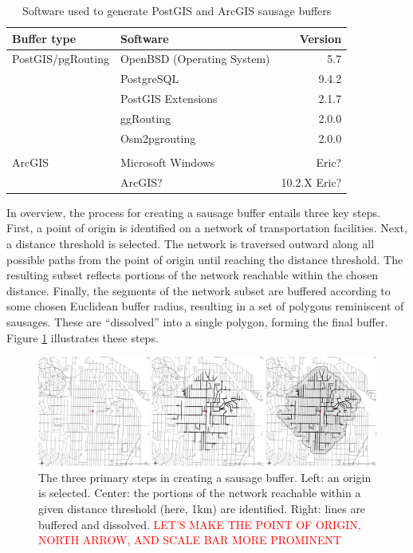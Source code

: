 \documentclass[11pt,letterpaper]{article} %
\begin{document}
\begin{table}[h!]
  \centering
  \caption{Software used to generate PostGIS and ArcGIS sausage buffers}
  \begin{tabular}{llr}
  \toprule
  Buffer type & Software & Version \\
  \midrule
PostGIS/pgRouting & OpenBSD (Operating System) & 5.7 \\
              & PostgreSQL & 9.4.2 \\
              & PostGIS Extensions & 2.1.7 \\
              & ggRouting & 2.0.0 \\
              & Osm2pgrouting & 2.0.0 \\
              &  &  \\
  ArcGIS & Microsoft Windows & Eric? \\
              & ArcGIS? & 10.2.X Eric? \\
  \bottomrule
\end{tabular}
\label{tab:software}
\end{table}

In overview, the process for creating a sausage buffer entails three
key steps. First, a point of origin is identified on a network of
transportation facilities. Next, a distance threshold is selected. The
network is traversed outward along all possible paths from the point
of origin until reaching the distance threshold. The resulting subset
reflects portions of the network reachable within the chosen
distance. Finally, the segments of the network subset are buffered
according to some chosen Euclidean buffer radius, resulting in a set of polygons
reminiscent of sausages. These are ``dissolved'' into a single polygon,
forming the final buffer. Figure \ref{fig:sausage-steps} illustrates
these steps.

\begin{figure}[h!]
  \centering
  \includegraphics[width=\textwidth]{./figs/sausage-steps}
  \caption{The three primary steps in creating a
    sausage buffer. Left: an origin is selected. Center: the portions
    of the network reachable within a given distance threshold (here,
    1km) are identified. Right: lines are buffered and dissolved.
\textcolor{red}{LET'S MAKE THE POINT OF ORIGIN, NORTH ARROW, AND SCALE BAR MORE PROMINENT}
}
	\label{fig:sausage-steps}
\end{figure}
\end{document}
